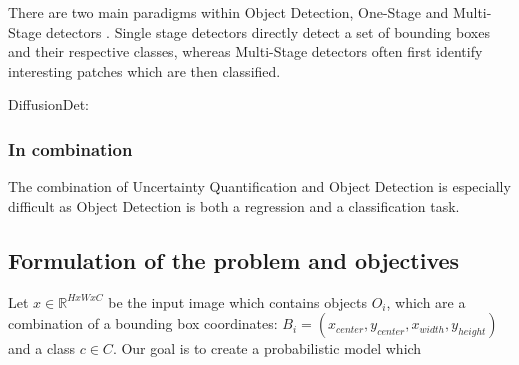 There are two main paradigms within Object Detection, One-Stage \cite{zhou2019objects, bochkovskiy2020yolov4, wang2022yolov7} and Multi-Stage detectors \cite{girshick2014rich, girshick2015fast}. Single stage detectors directly detect a set of bounding boxes and their respective classes, whereas Multi-Stage detectors often first identify interesting patches which are then classified.

DiffusionDet: \cite{chen2023diffusiondet}







\subsubsection{In combination}\label{sec:broadliterature:combination}
The combination of Uncertainty Quantification and Object Detection is especially difficult as Object Detection is both a regression and a classification task.

\cite{Gasperini_2022}

\subsection{Formulation of the problem and objectives}
Let $x \in \mathbb{R}^{HxWxC}$ be the input image which contains objects $O_i$, which are a combination of a bounding box coordinates: $B_i = (x_{center}, y_{center}, x_{width}, y_{height})$ and a class $c \in C$. Our goal is to create a probabilistic model which

\cite{Gasperini_2022}






